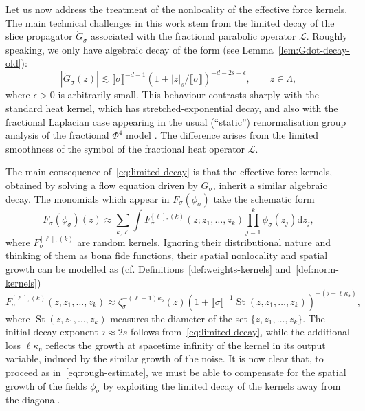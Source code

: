 \documentclass{article}
\numberwithin{equation}{section}
\newcommand{\mathd}{\mathrm{d}}
\theoremstyle{plain}
\theoremstyle{definition}
\begin{document}
Let us now address the treatment of the nonlocality of the effective force
kernels. The main technical challenges in this work stem from the limited
decay of the slice propagator $\dot{G}_{\sigma}$ associated with the
fractional parabolic operator $\mathcal{L}$. Roughly speaking, we only have
algebraic decay of the form (see Lemma~\ref{lem:Gdot-decay-old}):
\begin{equation}
  | \dot{G}_{\sigma} (z) | \lesssim   \llbracket \sigma \rrbracket^{- d - 1} 
  (1 + | z |_s / \llbracket \sigma \rrbracket)^{- d - 2 s + \epsilon}, \qquad
  z \in \Lambda, \label{eq:limited-decay}
\end{equation}
where $\epsilon > 0$ is arbitrarily small. This behaviour contrasts sharply
with the standard heat kernel, which has stretched-exponential decay, and also
with the fractional Laplacian case appearing in the usual (``static'')
renormalisation group analysis of the fractional $\Phi^4$
model {\cite{brydgesCriticalF42003}}. The difference arises from the limited
smoothness of the symbol of the fractional heat operator $\mathcal{L}$.

The main consequence of~\eqref{eq:limited-decay} is that the effective force
kernels, obtained by solving a flow equation driven by $\dot{G}_{\sigma}$,
inherit a similar algebraic decay. The monomials which appear in $F_{\sigma}
(\phi_{\sigma})$ take the schematic form
\[ F_{\sigma} (\phi_{\sigma}) (z) \approx \sum_{k, \ell} \int F^{[\ell],
   (k)}_{\sigma} (z ; z_1, \ldots, z_k) \prod_{j = 1}^k \phi_{\sigma} (z_j)
   \mathd z_j, \]
where $F^{[\ell], (k)}_{\sigma}$ are random kernels. Ignoring their
distributional nature and thinking of them as bona fide functions, their
spatial nonlocality and spatial growth can be modelled as (cf.
Definitions~\ref{def:weights-kernels} and~\ref{def:norm-kernels})
\[ F^{[\ell], (k)}_{\sigma} (z, z_1, \ldots, z_k) \approx \zeta_{\sigma}^{-
   (\ell + 1) \kappa_{\mathfrak{o}}} (z)  (1 + \llbracket \sigma \rrbracket^{-
   1} \operatorname{St} (z, z_1, \ldots, z_k) )^{- (\flat - \ell
   \kappa_{\mathfrak{o}})}, \]
where $\operatorname{St} (z, z_1, \ldots, z_k)$ measures the diameter of the set $\{
z, z_1, \ldots, z_k \}$. The initial decay exponent $\flat \approx 2 s$
follows from~\eqref{eq:limited-decay}, while the additional loss $\ell
\kappa_{\mathfrak{o}}$ reflects the growth at spacetime infinity of the kernel
in its output variable, induced by the similar growth of the noise. It is now
clear that, to proceed as in~\eqref{eq:rough-estimate}, we must be able to
compensate for the spatial growth of the fields $\phi_{\sigma}$ by exploiting
the limited decay of the kernels away from the diagonal.
\end{document}
